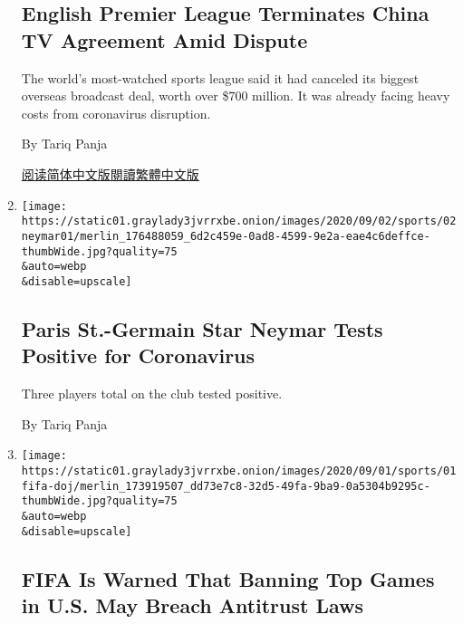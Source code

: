 \begin{enumerate}
{  \subsection{English Premier League Terminates China TV Agreement Amid
  Dispute}\label{english-premier-league-terminates-china-tv-agreement-amid-dispute}}

  The world's most-watched sports league said it had canceled its
  biggest overseas broadcast deal, worth over \$700 million. It was
  already facing heavy costs from coronavirus disruption.

  By Tariq Panja

  \href{https://cn.nytimes3xbfgragh.onion/sports/20200904/premier-league-china-contract-television/}{阅读简体中文版}\href{https://cn.nytimes3xbfgragh.onion/sports/20200904/premier-league-china-contract-television/zh-hant/}{閱讀繁體中文版}
\item
  \href{/2020/09/02/sports/soccer/neymar-PSG-coronavirus.html}{}

  \texttt{[image: https://static01.graylady3jvrrxbe.onion/images/2020/09/02/sports/02neymar01/merlin\_176488059\_6d2c459e-0ad8-4599-9e2a-eae4c6deffce-thumbWide.jpg?quality=75\\\&auto=webp\\\&disable=upscale]}

  \hypertarget{paris-st-germain-star-neymar-tests-positive-for-coronavirus}{%
  \subsection{Paris St.-Germain Star Neymar Tests Positive for
  Coronavirus}\label{paris-st-germain-star-neymar-tests-positive-for-coronavirus}}

  Three players total on the club tested positive.

  By Tariq Panja
\item
  \href{/2020/09/01/sports/soccer/fifa-antitrust-us.html}{}

  \texttt{[image: https://static01.graylady3jvrrxbe.onion/images/2020/09/01/sports/01fifa-doj/merlin\_173919507\_dd73e7c8-32d5-49fa-9ba9-0a5304b9295c-thumbWide.jpg?quality=75\\\&auto=webp\\\&disable=upscale]}

  \hypertarget{fifa-is-warned-that-banning-top-games-in-us-may-breach-antitrust-laws}{%
  \subsection{FIFA Is Warned That Banning Top Games in U.S. May Breach
  Antitrust
  Laws}\label{fifa-is-warned-that-banning-top-games-in-us-may-breach-antitrust-laws}}


\end{enumerate}
